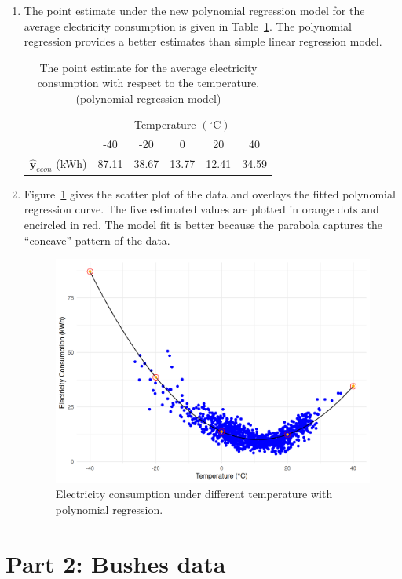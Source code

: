 \documentclass[12pt]{article}
\begin{document}
\begin{enumerate}
\item The point estimate under the new polynomial regression model for the average electricity consumption is given in Table~\ref{Tab:2}.
The polynomial regression provides a better estimates than simple linear regression model.

\begin{table}[htpb]
	\centering
	\begin{tabular}{cccccc}
		\toprule
		\multirow{2}{*}{} &
		\multicolumn{5}{c}{Temperature $(^{\circ}\text{C})$}\\
		 & -40 & -20 & 0 & 20 & 40 \\
		\midrule
		$\hat{\mathbf{y}}_{econ}$ (kWh)&87.11&38.67&13.77&12.41&34.59\\
		\bottomrule
	\end{tabular}
	\caption{The point estimate for the average electricity consumption with respect to the temperature. (polynomial regression model)}
	\label{Tab:2}
\end{table}

\item Figure~\ref{Fig:2} gives the scatter plot of the data and overlays the fitted polynomial regression curve. The five estimated values are plotted in orange dots and encircled in red. The model fit is better because the parabola captures the ``concave'' pattern of the data.

\begin{figure}[htbp]
\includegraphics[width=.7\textwidth]{2.png}
\centering
\caption{Electricity consumption under different temperature with polynomial regression.}
\label{Fig:2}
\end{figure}
\end{enumerate}


\section{Part 2: Bushes data}
	
\end{document}
